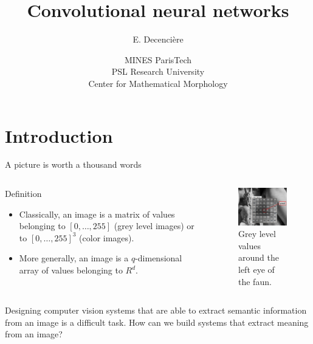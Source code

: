 \documentclass[xcolor=pdftex,dvipsnames,table,mathserif]{beamer}
\title{Convolutional neural networks}
\author{E. Decencière}
\date{MINES ParisTech\\
  PSL Research University\\
  Center for Mathematical Morphology
}
\begin{document}
\begin{frame}
\titlepage
\end{frame}



\section{Introduction}

\begin{frame}{A picture is worth a thousand words}

  \begin{columns}
    \begin{column}{.5\textwidth}
      \begin{block}{Definition}
        \begin{itemize}
        \item Classically, an image is a matrix of values belonging to $[0, \ldots, 255]$ (grey level images) or to $[0, \ldots, 255]^3$ (color images).
        \item More generally, an image is a $q$-dimensional array of values belonging to $R^d$.
        \end{itemize}
      \end{block}

    \end{column}

    \begin{column}{.5\textwidth}
      \begin{figure}
        \centering
        \includegraphics[width=4cm]{../graphics/faune.png}
        \caption{Grey level values around the left eye of the faun.}
      \end{figure}

    \end{column}
  \end{columns}

  \begin{alertblock}{}
   Designing computer vision systems that are able to extract semantic information from an image is a difficult task. How can we build systems that extract meaning from an image?
  \end{alertblock}

\end{frame}
\end{document}
